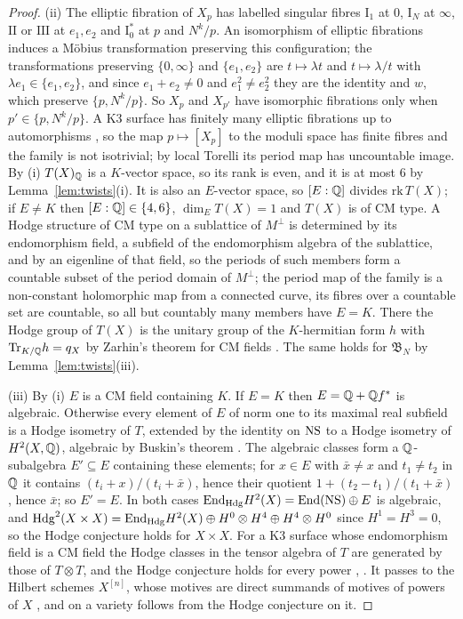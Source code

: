 \begin{proof}
(ii) The elliptic fibration of $X_{p}$ has labelled singular fibres $\mathrm{I}_{1}$ at $0$, $\mathrm{I}_{N}$ at $\infty$, $\mathrm{II}$ or $\mathrm{III}$ at $e_{1},e_{2}$ and $\mathrm{I}_{0}^{*}$ at $p$ and $N^{k}/p$. An isomorphism of elliptic fibrations induces a M\"obius transformation preserving this configuration; the transformations preserving $\{0,\infty\}$ and $\{e_{1},e_{2}\}$ are $t\mapsto\lambda t$ and $t\mapsto\lambda/t$ with $\lambda e_{1}\in\{e_{1},e_{2}\}$, and since $e_{1}+e_{2}\ne0$ and $e_{1}^{2}\ne e_{2}^{2}$ they are the identity and $w$, which preserve $\{p,N^{k}/p\}$. So $X_{p}$ and $X_{p'}$ have isomorphic fibrations only when $p'\in\{p,N^{k}/p\}$. A K3 surface has finitely many elliptic fibrations up to automorphisms \cite{Ste85}, so the map $p\mapsto[X_{p}]$ to the moduli space has finite fibres and the family is not isotrivial; by local Torelli its period map has uncountable image. By (i) $T(X)_{\mathbb{Q}}$ is a $K$-vector space, so its rank is even, and it is at most $6$ by Lemma~\ref{lem:twists}(i). It is also an $E$-vector space, so $[E:\mathbb{Q}]$ divides $\mathrm{rk}\,T(X)$; if $E\ne K$ then $[E:\mathbb{Q}]\in\{4,6\}$, $\dim_{E}T(X)=1$ and $T(X)$ is of CM type. A Hodge structure of CM type on a sublattice of $M^{\perp}$ is determined by its endomorphism field, a subfield of the endomorphism algebra of the sublattice, and by an eigenline of that field, so the periods of such members form a countable subset of the period domain of $M^{\perp}$; the period map of the family is a non-constant holomorphic map from a connected curve, its fibres over a countable set are countable, so all but countably many members have $E=K$. There the Hodge group of $T(X)$ is the unitary group of the $K$-hermitian form $h$ with $\mathrm{Tr}_{K/\mathbb{Q}}h=q_{X}$ by Zarhin's theorem for CM fields \cite[Thm.~2.3.1]{Zar83}. The same holds for $\mathfrak{B}_{N}$ by Lemma~\ref{lem:twists}(iii).

(iii) By (i) $E$ is a CM field containing $K$. If $E=K$ then $E=\mathbb{Q}+\mathbb{Q} f^{*}$ is algebraic. Otherwise every element of $E$ of norm one to its maximal real subfield is a Hodge isometry of $T$, extended by the identity on $\mathrm{NS}$ to a Hodge isometry of $H^{2}(X,\mathbb{Q})$, algebraic by Buskin's theorem \cite{Bus19}. The algebraic classes form a $\mathbb{Q}$-subalgebra $E'\subseteq E$ containing these elements; for $x\in E$ with $\bar x\ne x$ and $t_{1}\ne t_{2}$ in $\mathbb{Q}$ it contains $(t_{i}+x)/(t_{i}+\bar x)$, hence their quotient $1+(t_{2}-t_{1})/(t_{1}+\bar x)$, hence $\bar x$; so $E'=E$. In both cases $\mathrm{End}_{\mathrm{Hdg}}H^{2}(X)=\mathrm{End}(\mathrm{NS})\oplus E$ is algebraic, and $\mathrm{Hdg}^{2}(X\times X)=\mathrm{End}_{\mathrm{Hdg}}H^{2}(X)\oplus H^{0}\otimes H^{4}\oplus H^{4}\otimes H^{0}$ since $H^{1}=H^{3}=0$, so the Hodge conjecture holds for $X\times X$. For a K3 surface whose endomorphism field is a CM field the Hodge classes in the tensor algebra of $T$ are generated by those of $T\otimes T$, and the Hodge conjecture holds for every power \cite[Thm.~2.2, Cor.~2.3]{Var25}, \cite[Prop.~5.2, Thm.~5.4]{RM08}. It passes to the Hilbert schemes $X^{[n]}$, whose motives are direct summands of motives of powers of $X$ \cite{dCM02}, and \Fiii{} on a variety follows from the Hodge conjecture on it.
\end{proof}

